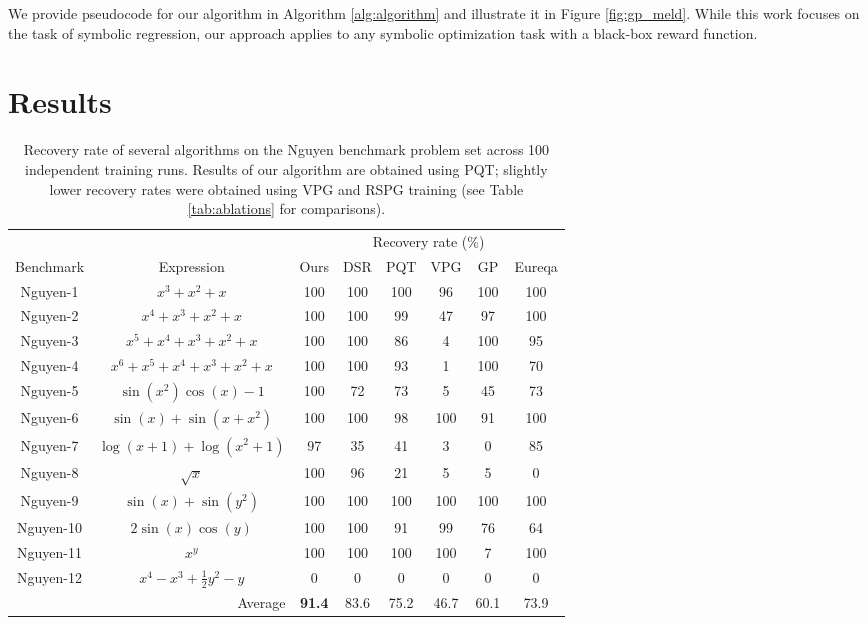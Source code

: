 \documentclass{article}
\begin{document}
We provide pseudocode for our algorithm in Algorithm \ref{alg:algorithm} and illustrate it in Figure \ref{fig:gp_meld}.
While this work focuses on the task of symbolic regression, our approach applies to any symbolic optimization task with a black-box reward function.

\section{Results}

\begin{table*}[t]
    \centering
    \caption{Recovery rate of several algorithms on the Nguyen benchmark problem set across 100 independent training runs. Results of our algorithm are obtained using PQT; slightly lower recovery rates were obtained using VPG and RSPG training (see Table \ref{tab:ablations} for comparisons).
    }
    \begin{tabular}{cccccccc}
    & & \multicolumn{6}{c}{Recovery rate (\%)} \\
    Benchmark & Expression & Ours & DSR & PQT & VPG & GP & Eureqa \\
    \midrule
    Nguyen-1 & $x^3+x^2+x$ & 100 & 100 & 100 & 96 & 100 & 100 \\
    Nguyen-2 & $x^4+x^3+x^2+x$ & 100 & 100 & 99 & 47 & 97 & 100 \\
    Nguyen-3 & $x^5+x^4+x^3+x^2+x$ & 100 & 100 & 86 & 4 & 100 & 95 \\
    Nguyen-4 & $x^6+x^5+x^4+x^3+x^2+x$ & 100 & 100 & 93 & 1 & 100 & 70 \\
    Nguyen-5 & $\sin(x^2)\cos(x)-1$ & 100 & 72 & 73 & 5 & 45 & 73 \\
    Nguyen-6 & $\sin(x)+\sin(x+x^2)$ & 100 & 100 & 98 & 100 & 91 & 100 \\
    Nguyen-7 & $\log(x+1)+\log(x^2+1)$ & 97 & 35 & 41 & 3 & 0 & 85 \\
    Nguyen-8 & $\sqrt{x}$ & 100 & 96 & 21 & 5 & 5 & 0 \\
    Nguyen-9 & $\sin(x)+\sin(y^2)$ & 100 & 100 & 100 & 100 & 100 & 100 \\
    Nguyen-10 & $2\sin(x)\cos(y)$ & 100 & 100 & 91 & 99 & 76 & 64 \\
    Nguyen-11 & $x^y$ & 100 & 100 & 100 & 100 & 7 & 100 \\
    Nguyen-12 & $x^4-x^3+\frac{1}{2}y^2-y$ & 0 & 0 & 0 & 0 & 0 & 0 \\
    \cmidrule{3-8}
    & \multicolumn{1}{r}{Average} & \textbf{91.4} & 83.6 & 75.2 & 46.7 & 60.1 & 73.9 \\
    \end{tabular}
    \label{tab:results}
\end{table*}
\end{document}
